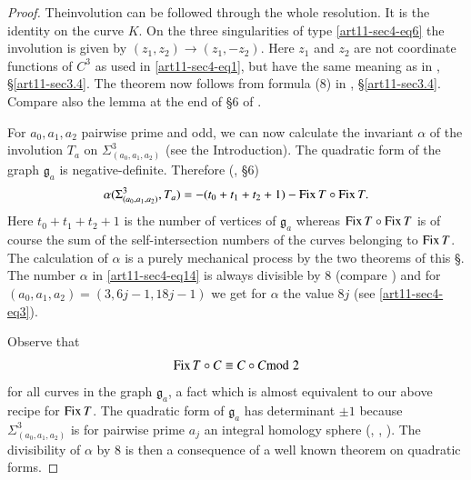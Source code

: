 \begin{proof}
The\pageoriginale involution can be followed through the whole resolution. It is the identity on the curve $K$. On the three singularities of type \eqref{art11-sec4-eq6} the involution is given by $(z_{1},z_{2})\to (z_{1},-z_{2})$. Here $z_{1}$ and $z_{2}$ are not coordinate functions of $C^{3}$ as used in \eqref{art11-sec4-eq1}, but have the same meaning as in \cite{art11-key6}, \S\ref{art11-sec3.4}. The theorem now follows from formula (8) in \cite{art11-key6}, \S\ref{art11-sec3.4}. Compare also the lemma at the end of \S6 of \cite{art11-sec7}.

For $a_{0},a_{1},a_{2}$ pairwise prime and odd, we can now calculate the invariant $\alpha$ of the involution $T_{a}$ on $\Sigma^{3}_{(a_{0},a_{1},a_{2})}$ (see the Introduction). The quadratic form of the graph $\mathfrak{g}_{a}$ is negative-definite. Therefore (\cite{art11-key7}, \S6)
\begin{equation}
\alpha(\Sigma^{3}_{(a_{0},a_{1},a_{2})},T_{a})=-(t_{0}+t_{1}+t_{2}+1)-\operatorname{\mathrm{Fix}} T\circ \operatorname{\mathrm{Fix}} T.\label{art11-sec4-eq14}
\end{equation}
Here $t_{0}+t_{1}+t_{2}+1$ is the number of vertices of $\mathfrak{g}_{a}$ whereas $\operatorname{\mathrm{Fix}} T\circ \operatorname{\mathrm{Fix}} T$ is of course the sum of the self-intersection numbers of the curves belonging to $\operatorname{\mathrm{Fix}} T$. The calculation of $\alpha$ is a purely mechanical process by the two theorems of this \S. The number $\alpha$ in \eqref{art11-sec4-eq14} is always divisible by 8 (compare \cite{art11-key7}) and for $(a_{0},a_{1},a_{2})=(3,6j-1,18j-1)$ we get for $\alpha$ the value $8j$ (see \eqref{art11-sec4-eq3}).

Observe that
\begin{equation}
\operatorname{\mathrm{Fix}} T\circ C\equiv C\circ C{\rm{mod}}\kern.3em 2\label{art11-sec4-eq15}
\end{equation}
for all curves in the graph $\mathfrak{g}_{a}$, a fact which is almost equivalent to our above recipe for $\operatorname{\mathrm{Fix}} T$. The quadratic form of $\mathfrak{g}_{a}$ has determinant $\pm 1$ because $\Sigma^{3}_{(a_{0},a_{1},a_{2})}$ is for pairwise prime $a_{j}$ an integral homology sphere (\cite{art11-key1}, \cite{art11-key2}, \cite{art11-key7}). The divisibility of $\alpha$ by 8 is then a consequence of a well known theorem on quadratic forms.


\end{proof}
